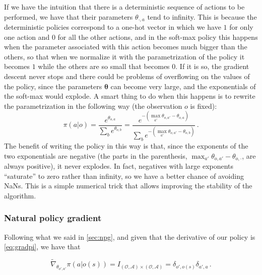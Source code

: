 If we have the intuition that there is a deterministic sequence of actions to be performed, we have that their parameters $\theta_{\cdot,a}$ tend to infinity. This is because the deterministic policies correspond to a one-hot vector in which we have $1$ for only one action and $0$ for all the other actions, and in the soft-max policy this happens when the parameter associated with this action becomes much bigger than the others, so that when we normalize it with the parametrization of the policy it becomes $1$ while the others are so small that becomes $0$. If it is so, the gradient descent never stops and there could be problems of overflowing on the values of the policy, since the parameters $\boldsymbol \theta$ can become very large, and the exponentials of the soft-max would explode. A smart thing to do when this happens is to rewrite the parametrization in the following way (the observation $o$ is fixed):
\begin{equation}
    \pi(a | o) = \frac{e^{\theta_{o,a}}}{\sum_b e^{\theta_{o,b}}} = \frac{e^{-(\max_{a'} \theta_{o,a'} - \theta_{o,a})}}{\sum_b e^{-(\max_{a'} \theta_{o,a'} - \theta_{o,b})}} \, .
    \label{eq:pi-clipped}
\end{equation}
The benefit of writing the policy in this way is that, since the exponents of the two exponentials are negative (the parts in the parenthesis, $\max_{a'} \theta_{o,a'} - \theta_{o,\cdot}$, are always positive), it never explodes. In fact, negatives with large exponents ``saturate'' to zero rather than infinity, so we have a better chance of avoiding NaNs. This is a simple numerical trick that allows improving the stability of the algorithm. %


\subsubsection{Natural policy gradient}

Following what we said in \autoref{sec:npg}, and given that the derivative of our policy is \eqref{eq:gradpi}, we have that

\begin{equation}
    \widetilde \nabla_{\theta_{o',a'}} \pi(a|o(s)) = I_{(\mathcal O, \mathcal A) \times (\mathcal O, \mathcal A)} = \delta_{o', o(s)} \delta_{a',a} \, .
\end{equation}

